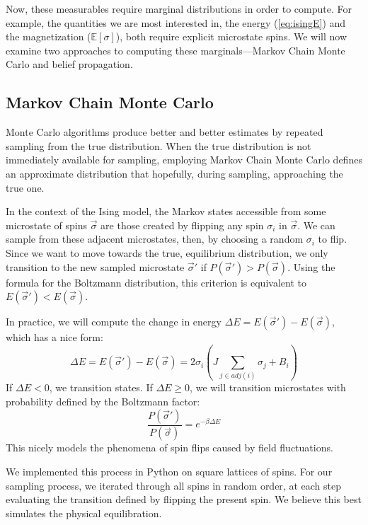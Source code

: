 \documentclass{article}
\begin{document}
Now, these measurables require marginal distributions in order to compute. 
For example, the quantities we are most interested in, the energy 
(\ref{eq:isingE}) and the magnetization ($\mathbb{E}[\sigma]$), both require 
explicit microstate spins. 
We will now examine two approaches to computing these marginals—Markov Chain 
Monte Carlo and belief propagation. 
%
%
%
%
%
\subsection{Markov Chain Monte Carlo}
%
%
%
%
%
Monte Carlo algorithms produce better and better estimates by repeated sampling 
from the true distribution. 
When the true distribution is not immediately available for sampling, employing 
Markov Chain Monte Carlo defines an approximate distribution that hopefully, 
during sampling, approaching the true one. 

In the context of the Ising model, the Markov states accessible from some 
microstate of spins $\vec{\sigma}$ are those created by flipping any spin 
$\sigma_i$ in $\vec{\sigma}$. 
We can sample from these adjacent microstates, then, by choosing a random 
$\sigma_i$ to flip. 
Since we want to move towards the true, equilibrium distribution, we only 
transition to the new sampled microstate $\vec{\sigma}'$ if 
$P(\vec{\sigma}') > P(\vec{\sigma})$. 
Using the formula for the Boltzmann distribution, this criterion is equivalent 
to $E(\vec{\sigma}') < E(\vec{\sigma})$. 

In practice, we will compute the change in energy 
$\Delta E = E(\vec{\sigma}') - E(\vec{\sigma})$, which has a nice form:
\[
    \Delta E = E(\vec{\sigma}') - E(\vec{\sigma}) = 2 \sigma_i (J \sum_{j \in adj(i)} \sigma_j + B_i)
\]
If $\Delta E < 0$, we transition states. 
If $\Delta E \geq 0$, we will transition microstates with probability defined by 
the Boltzmann factor:
\[
    \frac{P(\vec{\sigma}')}{P(\vec{\sigma})}
    = e^{-\beta \Delta E} 
\]
This nicely models the phenomena of spin flips caused by field fluctuations. 

We implemented this process in Python on square lattices of spins. 
For our sampling process, we iterated through all spins in random order, at each 
step evaluating the transition defined by flipping the present spin. 
We believe this best simulates the physical equilibration. 
\end{document}
